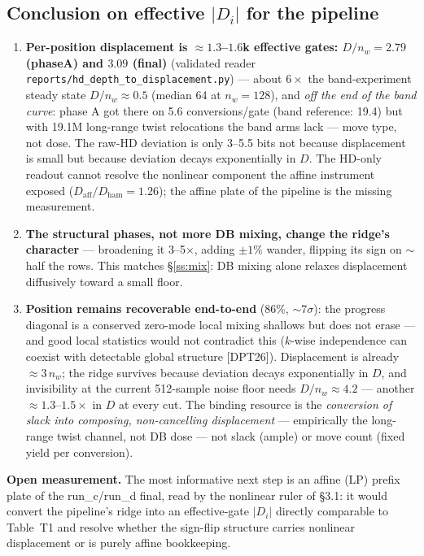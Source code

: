 \documentclass[11pt]{article}
\newcommand{\code}[1]{\texttt{#1}}
\newcommand{\Di}{\lvert D_i\rvert}
\begin{document}
\subsection{Conclusion on effective $\Di$ for the pipeline}
\begin{enumerate}
\item \textbf{Per-position displacement is $\approx1.3$--$1.6$k effective gates: $D/n_w=2.79$
(phaseA) and $3.09$ (final)} (validated reader \code{reports/hd\_depth\_to\_displacement.py}) ---
about $6\times$ the band-experiment steady state $D/n_w\approx0.5$ (median 64 at $n_w{=}128$), and
\emph{off the end of the band curve}: phase A got there on 5.6 conversions/gate (band reference: 19.4)
but with 19.1M long-range twist relocations the band arms lack --- move type, not dose. The raw-HD
deviation is only 3--5.5 bits not because displacement is small but because deviation decays
exponentially in $D$. The HD-only readout cannot resolve the nonlinear component the affine instrument
exposed ($D_{\mathrm{aff}}/D_{\mathrm{ham}}=1.26$); the affine plate of the pipeline is the missing
measurement.
\item \textbf{The structural phases, not more DB mixing, change the ridge's character} --- broadening
it 3--5$\times$, adding $\pm1\%$ wander, flipping its sign on $\sim$half the rows. This matches
\S\ref{ss:mix}: DB mixing alone relaxes displacement diffusively toward a small floor.
\item \textbf{Position remains recoverable end-to-end} (86\%, $\sim7\sigma$): the progress diagonal
is a conserved zero-mode local mixing shallows but does not erase --- and good local statistics would
not contradict this ($k$-wise independence can coexist with detectable global structure [DPT26]).
Displacement is already $\approx3\,n_w$; the ridge survives because deviation decays exponentially in
$D$, and invisibility at the current 512-sample noise floor needs $D/n_w\approx4.2$ --- another
$\approx1.3$--$1.5\times$ in $D$ at every cut. The binding resource is the \emph{conversion of slack
into composing, non-cancelling displacement} --- empirically the long-range twist channel, not DB
dose --- not slack (ample) or move count (fixed yield per conversion).
\end{enumerate}
\textbf{Open measurement.} The most informative next step is an affine (LP) prefix plate of the
run\_c/run\_d final, read by the nonlinear ruler of \S3.1: it would convert the pipeline's ridge into
an effective-gate $\Di$ directly comparable to Table~T1 and resolve whether the sign-flip structure
carries nonlinear displacement or is purely affine bookkeeping.
\end{document}
